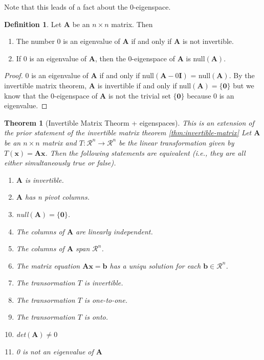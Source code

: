 \documentclass[
]{book}
\newtheorem{theorem}{Theorem}[chapter]
\theoremstyle{definition}
\newtheorem{definition}{Definition}[chapter]
\theoremstyle{definition}
\theoremstyle{definition}
\theoremstyle{definition}
\theoremstyle{remark}
\begin{document}
Note that this leads of a fact about the \(0\)-eigenspace.

\begin{definition}

Let \(\mathbf{A}\) be an \(n \times n\) matrix. Then

\begin{enumerate}
\def\labelenumi{\arabic{enumi})}
\item
  The number 0 is an eigenvalue of \(\mathbf{A}\) if and only if \(\mathbf{A}\) is not invertible.
\item
  If 0 is an eigenvalue of \(\mathbf{A}\), then the 0-eigenspace of \(\mathbf{A}\) is null\((\mathbf{A})\).
\end{enumerate}

\end{definition}

\begin{proof}
0 is an eigenvalue of \(\mathbf{A}\) if and only if null\((\mathbf{A} - 0 \mathbf{I})\) = null\((\mathbf{A})\). By the invertible matrix theorem, \(\mathbf{A}\) is invertible if and only if null\((\mathbf{A}) = \{\mathbf{0}\}\) but we know that the 0-eigenspace of \(\mathbf{A}\) is not the trivial set \(\{\mathbf{0}\}\) because 0 is an eigenvalue.
\end{proof}

\begin{theorem}[Invertible Matrix Theorm + eigenspaces]

This is an extension of the prior statement of the invertible matrix theorem \ref{thm:invertible-matrix}
Let \(\mathbf{A}\) be an \(n \times n\) matrix and \(T: \mathcal{R}^n \rightarrow \mathcal{R}^n\) be the linear transformation given by \(T(\mathbf{x}) = \mathbf{A}\mathbf{x}\). Then the following statements are equivalent (i.e., they are all either simultaneously true or false).

\begin{enumerate}
\def\labelenumi{\arabic{enumi})}
\item
  \(\mathbf{A}\) is invertible.
\item
  \(\mathbf{A}\) has n pivot columns.
\item
  null\((\mathbf{A}) = \{\mathbf{0}\}\).
\item
  The columns of \(\mathbf{A}\) are linearly independent.
\item
  The columns of \(\mathbf{A}\) span \(\mathcal{R}^n\).
\item
  The matrix equation \(\mathbf{A} \mathbf{x} = \mathbf{b}\) has a uniqu solution for each \(\mathbf{b} \in \mathcal{R}^n\).
\item
  The transormation \(T\) is invertible.
\item
  The transormation \(T\) is one-to-one.
\item
  The transormation \(T\) is onto.
\item
  det\((\mathbf{A}) \neq 0\)
\item
  0 is not an eigenvalue of \(\mathbf{A}\)
\end{enumerate}

\end{theorem}
\end{document}
